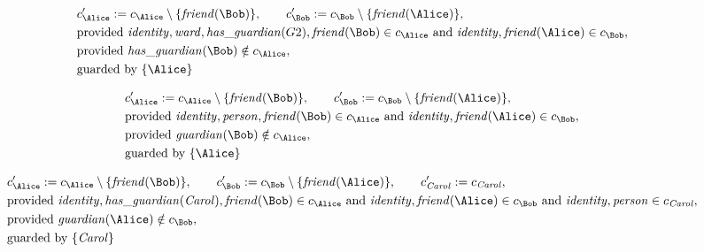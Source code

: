 \begin{align*}
&
c'_
{
\Alice
}
 := 
c_
{
\Alice
}
 \setminus 
\{
\mathit{\detokenize{
friend
}}
(
\Bob
)
\}
, \qquad 
c'_
{
\Bob
}
 := 
c_
{
\Bob
}
 \setminus 
\{
\mathit{\detokenize{
friend
}}
(
\Alice
)
\}
,\\
&
\text{provided } 
\mathit{\detokenize{
identity
}}
,
\mathit{\detokenize{
ward
}}
,
\mathit{\detokenize{
has_guardian
}}
(
G2
)
,
\mathit{\detokenize{
friend
}}
(
\Bob
)
 \in c_
{
\Alice
}
 \text{ and } 
\mathit{\detokenize{
identity
}}
,
\mathit{\detokenize{
friend
}}
(
\Alice
)
 \in c_
{
\Bob
}
,\\
&
\text{provided } 
\mathit{\detokenize{
has_guardian
}}
(
\Bob
)
 \notin c_
{
\Alice
}
,\\
&
\text{guarded by } \{
\Alice
\}
\end{align*}

\begin{align*}
&
c'_
{
\Alice
}
 := 
c_
{
\Alice
}
 \setminus 
\{
\mathit{\detokenize{
friend
}}
(
\Bob
)
\}
, \qquad 
c'_
{
\Bob
}
 := 
c_
{
\Bob
}
 \setminus 
\{
\mathit{\detokenize{
friend
}}
(
\Alice
)
\}
,\\
&
\text{provided } 
\mathit{\detokenize{
identity
}}
,
\mathit{\detokenize{
person
}}
,
\mathit{\detokenize{
friend
}}
(
\Bob
)
 \in c_
{
\Alice
}
 \text{ and } 
\mathit{\detokenize{
identity
}}
,
\mathit{\detokenize{
friend
}}
(
\Alice
)
 \in c_
{
\Bob
}
,\\
&
\text{provided } 
\mathit{\detokenize{
guardian
}}
(
\Bob
)
 \notin c_
{
\Alice
}
,\\
&
\text{guarded by } \{
\Alice
\}
\end{align*}

\begin{align*}
&
c'_
{
\Alice
}
 := 
c_
{
\Alice
}
 \setminus 
\{
\mathit{\detokenize{
friend
}}
(
\Bob
)
\}
, \qquad 
c'_
{
\Bob
}
 := 
c_
{
\Bob
}
 \setminus 
\{
\mathit{\detokenize{
friend
}}
(
\Alice
)
\}
, \qquad 
c'_
{
\mathit{Carol}
}
 := 
c_
{
\mathit{Carol}
}
,\\
&
\text{provided } 
\mathit{\detokenize{
identity
}}
,
\mathit{\detokenize{
has_guardian
}}
(
\mathit{Carol}
)
,
\mathit{\detokenize{
friend
}}
(
\Bob
)
 \in c_
{
\Alice
}
 \text{ and } 
\mathit{\detokenize{
identity
}}
,
\mathit{\detokenize{
friend
}}
(
\Alice
)
 \in c_
{
\Bob
}
 \text{ and } 
\mathit{\detokenize{
identity
}}
,
\mathit{\detokenize{
person
}}
 \in c_
{
\mathit{Carol}
}
,\\
&
\text{provided } 
\mathit{\detokenize{
guardian
}}
(
\Alice
)
 \notin c_
{
\Bob
}
,\\
&
\text{guarded by } \{
\mathit{Carol}
\}
\end{align*}

